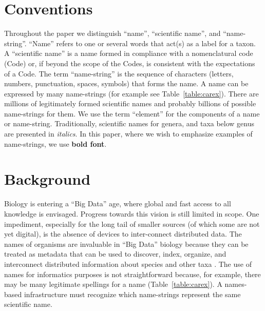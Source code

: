 \documentclass{bmcart}
\begin{document}


\section*{Conventions}

Throughout the paper we distinguish ``name'', ``scientific name'', and
``name-string''.  ``Name'' refers to one or several words that act(s) as a
label for a taxon. A ``scientific name'' is a name formed in compliance with a
nomenclatural code (Code) or, if beyond the scope of the Codes, is consistent
with the expectations of a Code.  The term ``name-string'' is the sequence of
characters (letters, numbers, punctuation, spaces, symbols) that forms the
name.  A name can be expressed by many name-strings (for example see
Table~\ref{table:carex}).  There are millions of legitimately formed scientific
names and probably billions of possible name-strings for them. We use the term
``element'' for the components of a name or name-string. Traditionally,
scientific names for genera, and taxa below genus are presented in
\textit{italics}. In this paper, where we wish to emphasize examples of
name-strings, we use \textbf{bold font}.

\section*{Background}

Biology is entering a ``Big Data'' age, where global and fast access to all
knowledge is envisaged. Progress towards this vision is still limited in
scope. One impediment, especially for the long tail of smaller sources (of
which some are not yet digital), is the absence of devices to inter-connect
distributed data.  The names of organisms are invaluable in ``Big Data''
biology because they can be treated as metadata that can be used to discover,
index, organize, and interconnect distributed information about species and
other taxa \cite{Patterson2010}.  The use of names for informatics purposes is
not straightforward because, for example, there may be many legitimate
spellings for a name (Table~\ref{table:carex}). A names-based infrastructure
must recognize which name-strings represent the same scientific name.
\end{document}

